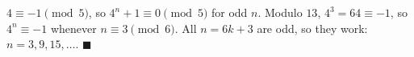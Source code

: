 $4\equiv-1\pmod5$, so $4^n+1\equiv0\pmod5$ for odd $n$. Modulo $13$, $4^3=64\equiv-1$, so $4^n\equiv-1$ whenever $n\equiv3\pmod6$. All $n=6k+3$ are odd, so they work: $\boxed{n=3,9,15,\dots}$. $\blacksquare$
